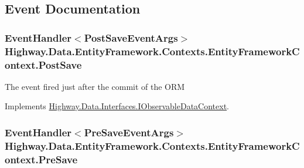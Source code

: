 \subsection{Event Documentation}
\hypertarget{class_highway_1_1_data_1_1_entity_framework_1_1_contexts_1_1_entity_framework_context_a2297153144a3e1240cb4526eb963b889}{
\subsubsection[{Post\-Save}]{\setlength{\rightskip}{0pt plus 5cm}Event\-Handler$<${\bf Post\-Save\-Event\-Args}$>$ Highway.\-Data.\-Entity\-Framework.\-Contexts.\-Entity\-Framework\-Context.\-Post\-Save}}\label{class_highway_1_1_data_1_1_entity_framework_1_1_contexts_1_1_entity_framework_context_a2297153144a3e1240cb4526eb963b889}


The event fired just after the commit of the O\-R\-M 



Implements \hyperlink{interface_highway_1_1_data_1_1_interfaces_1_1_i_observable_data_context_a1978b914f7b94a37a6e86f3314326ca9}{Highway.\-Data.\-Interfaces.\-I\-Observable\-Data\-Context}.

\hypertarget{class_highway_1_1_data_1_1_entity_framework_1_1_contexts_1_1_entity_framework_context_a4e307f212412dfd562cd70640d67709b}{
\subsubsection[{Pre\-Save}]{\setlength{\rightskip}{0pt plus 5cm}Event\-Handler$<${\bf Pre\-Save\-Event\-Args}$>$ Highway.\-Data.\-Entity\-Framework.\-Contexts.\-Entity\-Framework\-Context.\-Pre\-Save}}\label{class_highway_1_1_data_1_1_entity_framework_1_1_contexts_1_1_entity_framework_context_a4e307f212412dfd562cd70640d67709b}


